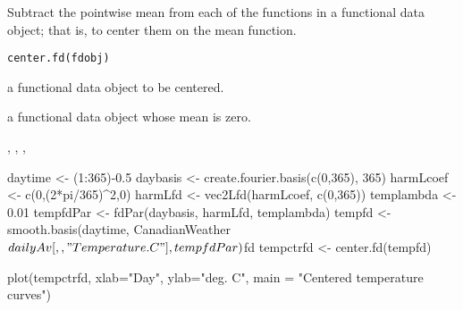 \documentclass{article}
\begin{document}
\begin{Description}\relax
Subtract the pointwise mean from each of the functions
in a functional data object; that is, to center them on the mean function.
\end{Description}
\begin{Usage}
\begin{verbatim}
center.fd(fdobj)
\end{verbatim}
\end{Usage}
\begin{Arguments}
\begin{ldescription}
\item[\code{fdobj}] a functional data object to be centered.

\end{ldescription}
\end{Arguments}
\begin{Value}
a functional data object whose mean is zero.
\end{Value}
\begin{SeeAlso}\relax
{}, 
, 
, 
\end{SeeAlso}
\begin{Examples}
\begin{ExampleCode}
daytime    <- (1:365)-0.5
daybasis   <- create.fourier.basis(c(0,365), 365)
harmLcoef  <- c(0,(2*pi/365)^2,0)
harmLfd    <- vec2Lfd(harmLcoef, c(0,365))
templambda <- 0.01
tempfdPar  <- fdPar(daybasis, harmLfd, templambda)
tempfd     <- smooth.basis(daytime,
       CanadianWeather$dailyAv[,,"Temperature.C"], tempfdPar)$fd
tempctrfd  <- center.fd(tempfd)

plot(tempctrfd, xlab="Day", ylab="deg. C",
     main = "Centered temperature curves")
\end{ExampleCode}
\end{Examples}
\end{document}
